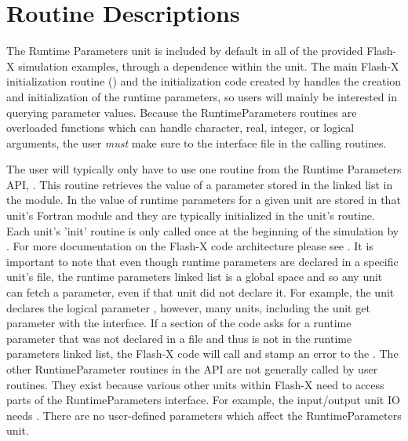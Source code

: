 \section{Routine Descriptions}
The Runtime Parameters unit is included by default in all of the
provided Flash-X simulation examples, through a dependence within the
 unit.
The main Flash-X initialization routine ()
and the initialization code created by  handles the
creation and initialization of the runtime parameters,
so users will mainly be interested in querying
parameter values.
Because the RuntimeParameters routines are overloaded functions
which can handle character, real, integer, or logical arguments, the
user \emph{must} make sure to  the interface file
 in the calling routines.

The user will typically only have to use one routine from the Runtime
Parameters API, 
\newline
{}.  This
routine retrieves the value of a parameter stored in the linked list
in the  module.  In \flashx the
value of runtime parameters for a given unit are stored in that unit's
 Fortran module and they are typically initialized in the unit's
 routine.  Each unit's 'init' routine is only
called once at the beginning of the simulation by . For more documentation
on the Flash-X code architecture please see .
It is important to note that even though runtime parameters are declared in a
specific unit's  file, the runtime parameters linked list is a global
space and so any unit can fetch a parameter, even if that unit did not declare it.
For example, the  unit declares the logical parameter ,
however, many units, including the  unit get  parameter with
the  interface.  If a
section of the code asks for a runtime parameter that was not declared
in a  file and thus is not in the runtime parameters
linked list, the Flash-X code will call  
and stamp an error to the .  The other RuntimeParameter
routines in the API are not generally called by user routines.
They exist because various other units within Flash-X need to
access parts of the RuntimeParameters interface.  For example, the input/output unit \unit{IO} needs
.  There are no user-defined parameters which affect the \unit{RuntimeParameters} unit.




